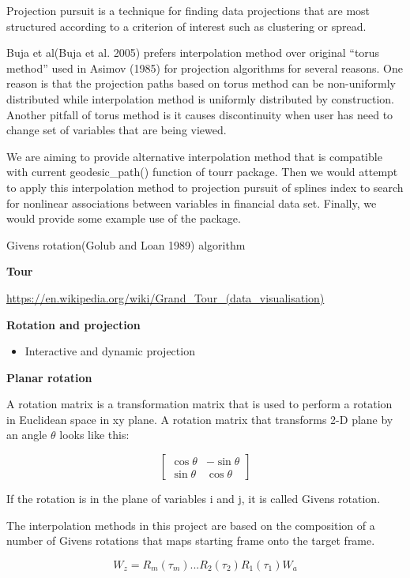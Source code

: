 Projection pursuit is a technique for finding data projections that are most structured according to a criterion of interest such as clustering or spread.

Buja et al(Buja et al. 2005) prefers interpolation method over original ``torus method'' used in Asimov (1985) for projection algorithms for several reasons. One reason is that the projection paths based on torus method can be non-uniformly distributed while interpolation method is uniformly distributed by construction. Another pitfall of torus method is it causes discontinuity when user has need to change set of variables that are being viewed.

We are aiming to provide alternative interpolation method that is compatible with current geodesic\_path() function of tourr package. Then we would attempt to apply this interpolation method to projection pursuit of splines index to search for nonlinear associations between variables in financial data set. Finally, we would provide some example use of the package.

Givens rotation(Golub and Loan 1989) algorithm

\textbf{Tour}

\url{https://en.wikipedia.org/wiki/Grand_Tour_(data_visualisation)}

\textbf{Rotation and projection}

\begin{itemize}
\tightlist
\item
  Interactive and dynamic projection
\end{itemize}

\textbf{Planar rotation}

A rotation matrix is a transformation matrix that is used to perform a rotation in Euclidean space in xy plane. A rotation matrix that transforms 2-D plane by an angle \(\theta\) looks like this:

\[ \begin{bmatrix}\cos \theta &-\sin \theta \\\sin \theta &\cos \theta \end{bmatrix} \]

If the rotation is in the plane of variables i and j, it is called Givens rotation.

The interpolation methods in this project are based on the composition of a number of Givens rotations that maps starting frame onto the target frame.

\[ W_z = R_m(\tau_m) ... R_2(\tau_2)R_1(\tau_1)W_a\]

